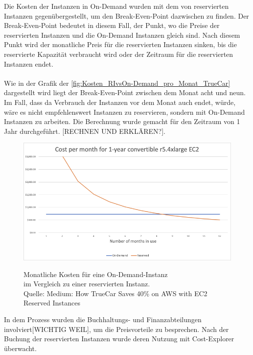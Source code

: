 Die Kosten der Instanzen in On-Demand wurden mit dem von reservierten Instanzen gegenübergestellt, um den Break-Even-Point dazwischen zu finden. Der Break-Even-Point bedeutet in diesem Fall, der Punkt, wo die Preise der reservierten Instanzen und die On-Demand Instanzen gleich sind. Nach diesem Punkt wird der monatliche Preis für die reservierten Instanzen sinken, bis die reservierte Kapazität verbraucht wird oder der Zeitraum für die reservierten Instanzen endet.
\\\\
Wie in der Grafik der \autoref{fig:Kosten_RIvsOn-Demand_pro_Monat_TrueCar} dargestellt wird liegt der Break-Even-Point zwischen dem Monat acht und neun. Im Fall, dass da Verbrauch der Instanzen vor dem Monat auch endet, würde, wäre es nicht empfehlenswert Instanzen zu reservieren, sondern mit On-Demand Instanzen zu arbeiten. Die Berechnung wurde gemacht für den Zeitraum von 1 Jahr durchgeführt. [RECHNEN UND ERKLÄREN?]. 
\begin{figure}[h!]
  \centering
  \includegraphics[scale=0.6]{sources/Kosten_RIvsOn-Demand_pro_Monat_TrueCar}\label{fig:Kosten_RIvsOn-Demand_pro_Monat_TrueCar}\\
  \caption[Monatliche Kosten für eine On-Demand-Instanz im Vergleich zu einer reservierten Instanz]{}
  \label{fig:Kosten_RIvsOn-Demand_pro_Monat_TrueCar}Monatliche Kosten für eine On-Demand-Instanz\\ im Vergleich zu einer reservierten Instanz.\\
  Quelle: Medium: How TrueCar Saves 40\% on AWS with EC2 Reserved Instances{\cite{MED1}}
\end{figure}
In dem Prozess wurden die Buchhaltungs- und Finanzabteilungen involviert[WICHTIG WEIL], um die Preisvorteile zu besprechen. Nach der Buchung der reservierten Instanzen wurde deren Nutzung mit Cost-Explorer überwacht. 
